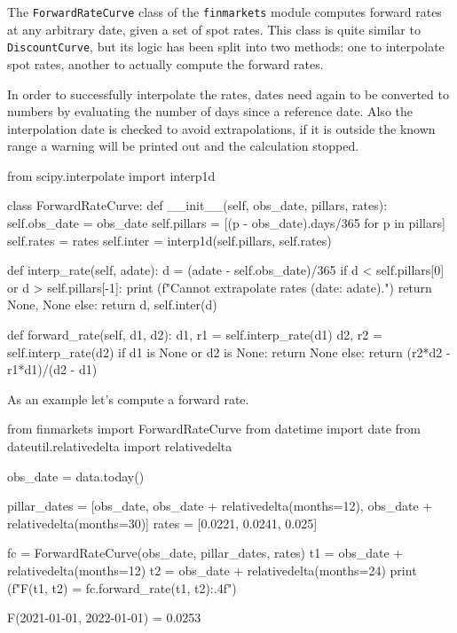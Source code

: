 \begin{finmarkets}
The \texttt{ForwardRateCurve} class of the \texttt{finmarkets} module computes forward rates at any arbitrary date, given a set of spot rates. This class is quite similar to \texttt{DiscountCurve}, but its logic has been split into two methods: one to interpolate spot rates, another to actually compute the forward rates.

In order to successfully interpolate the rates, dates need again to be converted to numbers by evaluating the number of days since a reference date. Also the interpolation date is checked to avoid extrapolations, if it is outside the known range a warning will be printed out and the calculation stopped.
\end{finmarkets}

\begin{ipython}
from scipy.interpolate import interp1d

class ForwardRateCurve:
    def __init__(self, obs_date, pillars, rates):
        self.obs_date = obs_date
        self.pillars = [(p - obs_date).days/365 for p in pillars]
        self.rates = rates
        self.inter = interp1d(self.pillars, self.rates)

    def interp_rate(self, adate):
        d = (adate - self.obs_date)/365
        if d < self.pillars[0] or d > self.pillars[-1]:
            print (f"Cannot extrapolate rates (date: {adate}).")
            return None, None
        else:
            return d, self.inter(d)

    def forward_rate(self, d1, d2):
        d1, r1 = self.interp_rate(d1)
        d2, r2 = self.interp_rate(d2)
        if d1 is None or d2 is None:
            return None
        else:
            return (r2*d2 - r1*d1)/(d2 - d1)
\end{ipython}

As an example let's compute a forward rate.
\begin{ipython}
from finmarkets import ForwardRateCurve
from datetime import date
from dateutil.relativedelta import relativedelta

obs_date = data.today()

pillar_dates = [obs_date,
                obs_date + relativedelta(months=12),
                obs_date + relativedelta(months=30)]
rates = [0.0221, 0.0241, 0.025]

fc = ForwardRateCurve(obs_date, pillar_dates, rates)
t1 = obs_date + relativedelta(months=12)
t2 = obs_date + relativedelta(months=24)
print (f"F({t1}, {t2}) = {fc.forward_rate(t1, t2):.4f}")
\end{ipython}
\begin{ioutput}
F(2021-01-01, 2022-01-01) = 0.0253
\end{ioutput}

